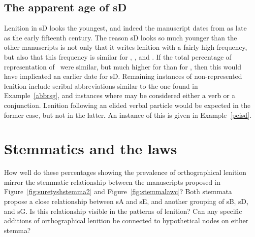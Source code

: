 \subsection{The apparent age of \gls{sD}}
\label{sec:apparent-age-glssd}

Lenition in \gls{sD} looks the youngest, and indeed the manuscript dates from as late as the early fifteenth century. The reason \gls{sD} looks so much younger than the other manuscripts is not only that it writes lenition with a fairly high frequency, but also that this frequency is similar for , , and . If the total percentage of representation of \lT\ were similar, but much higher for  than for , then this would have implicated an earlier date for \gls{sD}. Remaining instances of non-represented lenition include scribal abbreviations similar to the one found in  Example~\ref{abbrsg}, and instances where   may be considered either a verb or a conjunction. Lenition following an elided verbal particle  would be expected in the former case, but not in the latter. An instance of this is given in Example~\ref{peisd}.

\section{Stemmatics and the laws}
\label{sec:stemmatics-laws}


How well do these percentages showing the prevalence of orthographical lenition mirror the stemmatic relationship between the manuscripts proposed in Figure~\ref{fig:suretyshstemma2} and Figure~\ref{fig:stemmalawc}? Both stemmata propose a close relationship between \gls{sA} and \gls{sE}, and another grouping of \gls{sB}, \gls{sD}, and \gls{sG}. Is this relationship visible in the patterns of lenition? Can any specific additions of orthographical lenition be connected to hypothetical nodes on either stemma?

